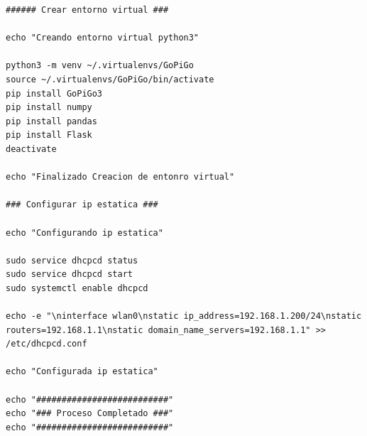 \begin{enumerate}
\begin{lstlisting}[frame=single,breaklines=true, label=Ejecutable para la instalación y configuración de la Raspberry Pi, caption=Ejecutable para la instalación y configuración de la Raspberry Pi,  captionpos=b]
###### Crear entorno virtual ###

echo "Creando entorno virtual python3"

python3 -m venv ~/.virtualenvs/GoPiGo
source ~/.virtualenvs/GoPiGo/bin/activate
pip install GoPiGo3
pip install numpy
pip install pandas
pip install Flask
deactivate

echo "Finalizado Creacion de entonro virtual"

### Configurar ip estatica ###

echo "Configurando ip estatica"

sudo service dhcpcd status
sudo service dhcpcd start
sudo systemctl enable dhcpcd

echo -e "\ninterface wlan0\nstatic ip_address=192.168.1.200/24\nstatic routers=192.168.1.1\nstatic domain_name_servers=192.168.1.1" >> /etc/dhcpcd.conf

echo "Configurada ip estatica"

echo "##########################"
echo "### Proceso Completado ###"
echo "##########################"


\end{lstlisting}
\end{enumerate}
